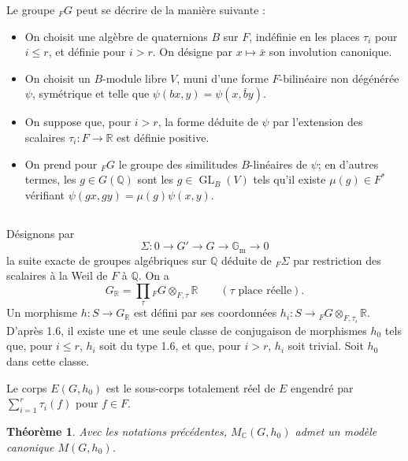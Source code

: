 \documentclass[11pt]{amsart}
\theoremstyle{plain}
\newtheorem{theorem}{Th\'eor\`eme}[section]
\theoremstyle{definition}
\DeclareMathOperator{\GL}{GL}
\newcommand{\QQ}{\mathbb{Q}}
\newcommand{\RR}{\mathbb{R}}
\newcommand{\MC}{M_{\mathbb{C}}}
\begin{document}
Le groupe ${}_F G$ peut se d\'ecrire de la mani\`ere suivante :
\begin{itemize}
\item[(a)] On choisit une alg\`ebre de quaternions $B$ sur $F$, ind\'efinie en les places $\tau_i$ pour $i \leq r$, et d\'efinie pour $i > r$. On d\'esigne par $x \mapsto \bar{x}$ son involution canonique.
\item[(b)] On choisit un $B$-module libre $V$, muni d'une forme $F$-bilin\'eaire non d\'eg\'en\'er\'ee $\psi$, sym\'etrique et telle que $\psi(bx,y) = \psi(x, \bar{b} y)$.
\item[(c)] On suppose que, pour $i > r$, la forme d\'eduite de $\psi$ par l'extension des scalaires $\tau_i : F \to \RR$ est d\'efinie positive.
\item[(d)] On prend pour ${}_F G$ le groupe des similitudes $B$-lin\'eaires de $\psi$; en d'autres termes, les $g \in G(\QQ)$ sont les $g \in \GL_B(V)$ tels qu'il existe $\mu(g) \in F^*$ v\'erifiant $\psi(gx, gy) = \mu(g) \psi(x,y)$.
\end{itemize}

\subsection{}

D\'esignons par
\begin{equation}\label{eq:6.3.1}
\Sigma : 0 \longrightarrow G' \longrightarrow G \longrightarrow \mathbb{G}_{\mathrm{m}} \longrightarrow 0
\end{equation}
la suite exacte de groupes alg\'ebriques sur $\QQ$ d\'eduite de ${}_F \Sigma$ par restriction des scalaires \`a la Weil de $F$ \`a $\QQ$. On a
\begin{equation}\label{eq:6.3.2}
G_{\RR} = \prod_{\tau} {}_F G \otimes_{F,\tau} \RR \qquad (\tau \text{ place r\'eelle}).
\end{equation}
Un morphisme $h : S \to G_{\RR}$ est d\'efini par ses coordonn\'ees $h_i : S \to {}_F G \otimes_{F,\tau_i} \RR$. D'apr\`es 1.6, il existe une et une seule classe de conjugaison de morphismes $h_0$ tels que, pour $i \leq r$, $h_i$ soit du type 1.6, et que, pour $i > r$, $h_i$ soit trivial. Soit $h_0$ dans cette classe.

Le corps $E(G,h_0)$ est le sous-corps totalement r\'eel de $E$ engendr\'e par $\sum_{i=1}^r \tau_i(f)$ pour $f \in F$.

\begin{theorem}
Avec les notations pr\'ec\'edentes, $\MC(G,h_0)$ admet un mod\`ele canonique $M(G,h_0)$.
\end{theorem}
\end{document}
